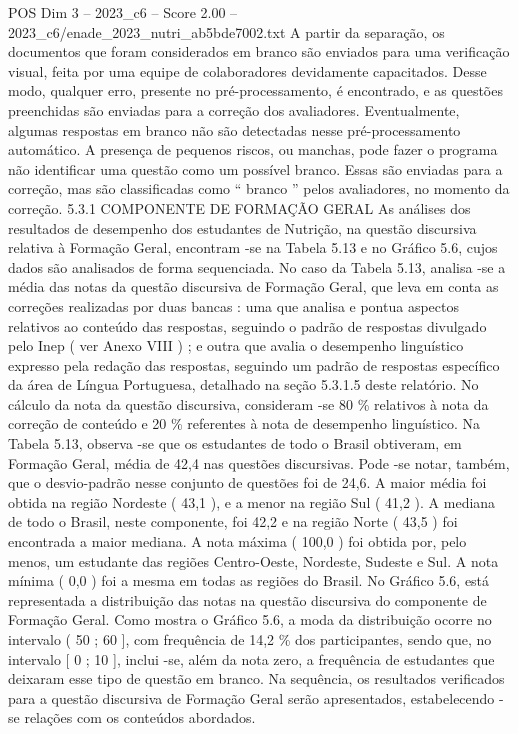 \begin{textsample}{POS Dim 3 – 2023\_c6 – Score 2.00 – 2023\_c6/enade\_2023\_nutri\_ab5bde7002.txt}
A partir da separação, os documentos que foram considerados em branco são enviados para uma verificação visual, feita por uma equipe de colaboradores devidamente capacitados.
Desse modo, qualquer erro, presente no pré-processamento, é encontrado, e as questões preenchidas são enviadas para a correção dos avaliadores.
Eventualmente, algumas respostas em branco não são detectadas nesse pré-processamento automático.
A presença de pequenos riscos, ou manchas, pode fazer o programa não identificar uma questão como um possível branco.
Essas são enviadas para a correção, mas são classificadas como “ branco ” pelos avaliadores, no momento da correção. 5.3.1 COMPONENTE DE FORMAÇÃO GERAL As análises dos resultados de desempenho dos estudantes de Nutrição, na questão discursiva relativa à Formação Geral, encontram -se na Tabela 5.13 e no Gráfico 5.6, cujos dados são analisados de forma sequenciada.
No caso da Tabela 5.13, analisa -se a média das notas da questão discursiva de Formação Geral, que leva em conta as correções realizadas por duas bancas : uma que analisa e pontua aspectos relativos ao conteúdo das respostas, seguindo o padrão de respostas divulgado pelo Inep ( ver Anexo VIII ) ; e outra que avalia o desempenho linguístico expresso pela redação das respostas, seguindo um padrão de respostas específico da área de Língua Portuguesa, detalhado na seção 5.3.1.5 deste relatório.
No cálculo da nota da questão discursiva, consideram -se 80 \% relativos à nota da correção de conteúdo e 20 \% referentes à nota de desempenho linguístico.
Na Tabela 5.13, observa -se que os estudantes de todo o Brasil obtiveram, em Formação Geral, média de 42,4 nas questões discursivas.
Pode -se notar, também, que o desvio-padrão nesse conjunto de questões foi de 24,6.
A maior média foi obtida na região Nordeste ( 43,1 ), e a menor na região Sul ( 41,2 ).
A mediana de todo o Brasil, neste componente, foi 42,2 e na região Norte ( 43,5 ) foi encontrada a maior mediana.
A nota máxima ( 100,0 ) foi obtida por, pelo menos, um estudante das regiões Centro-Oeste, Nordeste, Sudeste e Sul.
A nota mínima ( 0,0 ) foi a mesma em todas as regiões do Brasil.
No Gráfico 5.6, está representada a distribuição das notas na questão discursiva do componente de Formação Geral.
Como mostra o Gráfico 5.6, a moda da distribuição ocorre no intervalo ( 50 ; 60 ], com frequência de 14,2 \% dos participantes, sendo que, no intervalo [ 0 ; 10 ], inclui -se, além da nota zero, a frequência de estudantes que deixaram esse tipo de questão em branco.
Na sequência, os resultados verificados para a questão discursiva de Formação Geral serão apresentados, estabelecendo -se relações com os conteúdos abordados.

\end{textsample}
